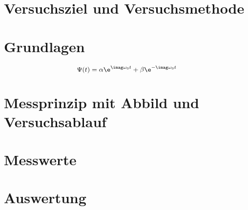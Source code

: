 \documentclass[
12pt,
a4paper,
bibliography=totocnumbered, %
BCOR=1cm, %
oneside, %
]{scrartcl}
\begin{document}
\thispagestyle{empty}



\thispagestyle{empty}

\tableofcontents

\clearpage %

\renewcommand{\thepage}{\arabic{page}}
\setcounter{page}{1}

\section[Versuchsziel]{Versuchsziel und Versuchsmethode}

\section{Grundlagen}

\begin{equation}
	\Psi(t) = \alpha \e^{\imag \omega_0 t} + \beta \e^{- \imag \omega_0 t}
\end{equation}

\section[Messprinzip]{Messprinzip mit Abbild und Versuchsablauf}


\section{Messwerte}


\section{Auswertung}
\end{document}
